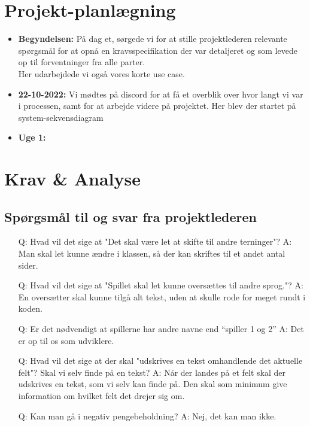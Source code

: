 \documentclass{article}
\begin{document}
\section{Projekt-planlægning}
\begin {itemize}
\item [\textbf{Begyndelsen:}]På dag et, sørgede vi for at stille projektlederen relevante spørgsmål for at opnå en kravsspecifikation der var detaljeret og som levede op til forventninger fra alle parter.\\
Her udarbejdede vi også vores korte use case.
\item [\textbf{22-10-2022:}] Vi mødtes på discord for at få et overblik over hvor langt vi var i processen, samt for at arbejde videre på projektet. Her blev der startet på system-sekvensdiagram

 \item [\textbf{Uge 1:}]

\end {itemize}

\section{Krav \& Analyse}
\subsection{Spørgsmål til og svar fra projektlederen}

\begin{itemize}
    \item [Q:] Hvad vil det sige at "Det skal være let at skifte til andre terninger"?
            \subitem A: Man skal let kunne ændre i klassen, så der kan skriftes til et andet antal sider.
    \item [Q:] Hvad vil det sige at "Spillet skal let kunne oversættes til andre sprog."?
            \subitem A: En oversætter skal kunne tilgå alt tekst, uden at skulle rode for meget rundt i koden.
    \item [Q:] Er det nødvendigt at spillerne har andre navne end “spiller 1 og 2”
            \subitem A: Det er op til os som udviklere.
    \item [Q:] Hvad vil det sige at der skal "udskrives en tekst omhandlende det aktuelle felt"? Skal vi selv finde på en tekst?
            \subitem A: Når der landes på et felt skal der udskrives en tekst, som vi selv kan finde på. Den skal som minimum give information om hvilket felt det drejer sig om.
    \item [Q:] Kan man gå i negativ pengebeholdning?
            \subitem A: Nej, det kan man ikke. 
\end{itemize}
\end{document}
